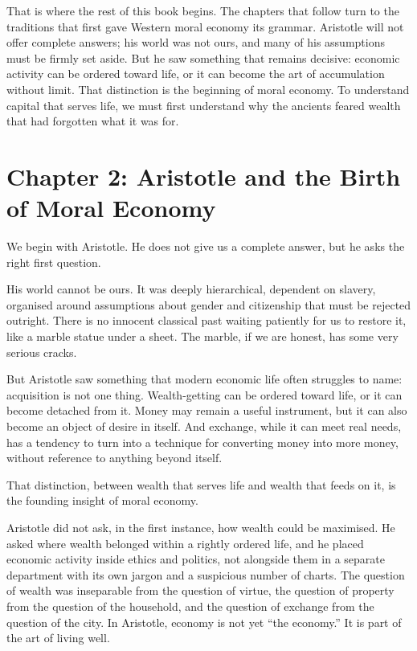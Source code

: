 \documentclass[11pt,a4paper,oneside]{book}
\begin{document}
That is where the rest of this book begins. The chapters that follow turn to the traditions that first gave Western moral economy its grammar. Aristotle will not offer complete answers; his world was not ours, and many of his assumptions must be firmly set aside. But he saw something that remains decisive: economic activity can be ordered toward life, or it can become the art of accumulation without limit. That distinction is the beginning of moral economy. To understand capital that serves life, we must first understand why the ancients feared wealth that had forgotten what it was for.

\chapter*{Chapter 2: Aristotle and the Birth of Moral Economy}

We begin with Aristotle. He does not give us a complete answer, but he asks the right first question.

His world cannot be ours. It was deeply hierarchical, dependent on slavery, organised around assumptions about gender and citizenship that must be rejected outright. There is no innocent classical past waiting patiently for us to restore it, like a marble statue under a sheet. The marble, if we are honest, has some very serious cracks.

But Aristotle saw something that modern economic life often struggles to name: acquisition is not one thing. Wealth-getting can be ordered toward life, or it can become detached from it. Money may remain a useful instrument, but it can also become an object of desire in itself. And exchange, while it can meet real needs, has a tendency to turn into a technique for converting money into more money, without reference to anything beyond itself.

That distinction, between wealth that serves life and wealth that feeds on it, is the founding insight of moral economy.

Aristotle did not ask, in the first instance, how wealth could be maximised. He asked where wealth belonged within a rightly ordered life, and he placed economic activity inside ethics and politics, not alongside them in a separate department with its own jargon and a suspicious number of charts. The question of wealth was inseparable from the question of virtue, the question of property from the question of the household, and the question of exchange from the question of the city. In Aristotle, economy is not yet ``the economy.'' It is part of the art of living well.
\end{document}
